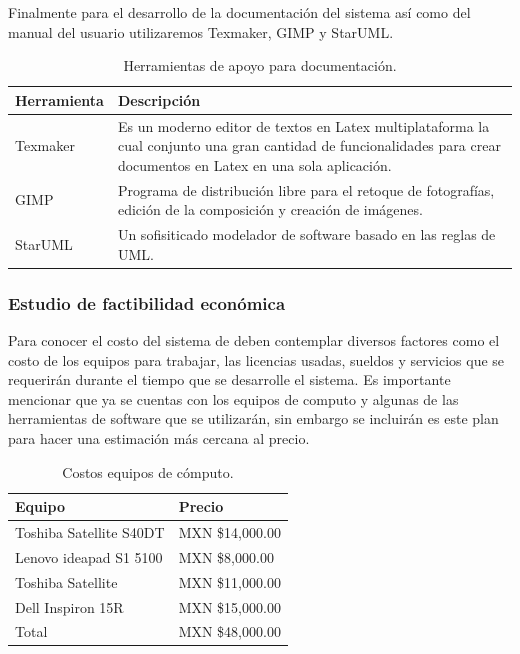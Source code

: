 \documentclass[12pt]{report}
\begin{document}
Finalmente para el desarrollo de la documentación del sistema así como del manual del usuario utilizaremos Texmaker, GIMP y StarUML.
\begin{table}[H]
\begin{center}
\begin{tabular}{|p{40mm}|p{100mm}|}
\hline
 Herramienta & Descripción\\
\hline \hline 
Texmaker & Es un moderno editor de textos en Latex multiplataforma la cual conjunto una gran cantidad de funcionalidades para crear documentos en Latex en una sola aplicación.\cite{texm}\\
\hline
GIMP &  Programa de distribución libre para el retoque de fotografías, edición de la composición y creación de imágenes.\cite{gimp}\\
\hline
StarUML & Un sofisiticado modelador de software basado en las reglas de UML.\cite{star} \\
\hline
\end{tabular}
\caption{Herramientas de apoyo para documentación.}
\end{center}
\end{table}

\subsubsection{Estudio de factibilidad económica}
Para conocer el costo del sistema de deben contemplar diversos factores como el costo de los equipos para trabajar, las licencias usadas, sueldos y servicios que se requerirán durante el tiempo que se desarrolle el sistema. Es importante mencionar que 
ya se cuentas con los equipos de computo y algunas de las herramientas de software que se utilizarán, sin embargo se incluirán es este plan para hacer una estimación más cercana al precio.\\
\begin{table}[H]
\begin{center}
\begin{tabular}{|p{40mm}|p{40mm}|}
\hline
Equipo & Precio \\
\hline \hline 
Toshiba Satellite S40DT & MXN \$14,000.00\\
\hline
Lenovo ideapad S1 5100 & MXN \$8,000.00\\
\hline
Toshiba Satellite & MXN \$11,000.00 \\
\hline
Dell Inspiron 15R & MXN \$15,000.00\\
\hline \hline
Total & MXN \$48,000.00\\
\hline
\end{tabular}
\caption{Costos equipos de cómputo.}
\end{center}
\end{table}
\end{document}
